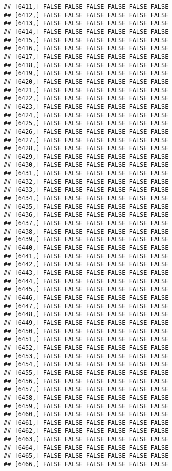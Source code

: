 \documentclass[
]{article}
\begin{document}
\begin{verbatim}
## [6411,] FALSE FALSE FALSE FALSE FALSE FALSE
## [6412,] FALSE FALSE FALSE FALSE FALSE FALSE
## [6413,] FALSE FALSE FALSE FALSE FALSE FALSE
## [6414,] FALSE FALSE FALSE FALSE FALSE FALSE
## [6415,] FALSE FALSE FALSE FALSE FALSE FALSE
## [6416,] FALSE FALSE FALSE FALSE FALSE FALSE
## [6417,] FALSE FALSE FALSE FALSE FALSE FALSE
## [6418,] FALSE FALSE FALSE FALSE FALSE FALSE
## [6419,] FALSE FALSE FALSE FALSE FALSE FALSE
## [6420,] FALSE FALSE FALSE FALSE FALSE FALSE
## [6421,] FALSE FALSE FALSE FALSE FALSE FALSE
## [6422,] FALSE FALSE FALSE FALSE FALSE FALSE
## [6423,] FALSE FALSE FALSE FALSE FALSE FALSE
## [6424,] FALSE FALSE FALSE FALSE FALSE FALSE
## [6425,] FALSE FALSE FALSE FALSE FALSE FALSE
## [6426,] FALSE FALSE FALSE FALSE FALSE FALSE
## [6427,] FALSE FALSE FALSE FALSE FALSE FALSE
## [6428,] FALSE FALSE FALSE FALSE FALSE FALSE
## [6429,] FALSE FALSE FALSE FALSE FALSE FALSE
## [6430,] FALSE FALSE FALSE FALSE FALSE FALSE
## [6431,] FALSE FALSE FALSE FALSE FALSE FALSE
## [6432,] FALSE FALSE FALSE FALSE FALSE FALSE
## [6433,] FALSE FALSE FALSE FALSE FALSE FALSE
## [6434,] FALSE FALSE FALSE FALSE FALSE FALSE
## [6435,] FALSE FALSE FALSE FALSE FALSE FALSE
## [6436,] FALSE FALSE FALSE FALSE FALSE FALSE
## [6437,] FALSE FALSE FALSE FALSE FALSE FALSE
## [6438,] FALSE FALSE FALSE FALSE FALSE FALSE
## [6439,] FALSE FALSE FALSE FALSE FALSE FALSE
## [6440,] FALSE FALSE FALSE FALSE FALSE FALSE
## [6441,] FALSE FALSE FALSE FALSE FALSE FALSE
## [6442,] FALSE FALSE FALSE FALSE FALSE FALSE
## [6443,] FALSE FALSE FALSE FALSE FALSE FALSE
## [6444,] FALSE FALSE FALSE FALSE FALSE FALSE
## [6445,] FALSE FALSE FALSE FALSE FALSE FALSE
## [6446,] FALSE FALSE FALSE FALSE FALSE FALSE
## [6447,] FALSE FALSE FALSE FALSE FALSE FALSE
## [6448,] FALSE FALSE FALSE FALSE FALSE FALSE
## [6449,] FALSE FALSE FALSE FALSE FALSE FALSE
## [6450,] FALSE FALSE FALSE FALSE FALSE FALSE
## [6451,] FALSE FALSE FALSE FALSE FALSE FALSE
## [6452,] FALSE FALSE FALSE FALSE FALSE FALSE
## [6453,] FALSE FALSE FALSE FALSE FALSE FALSE
## [6454,] FALSE FALSE FALSE FALSE FALSE FALSE
## [6455,] FALSE FALSE FALSE FALSE FALSE FALSE
## [6456,] FALSE FALSE FALSE FALSE FALSE FALSE
## [6457,] FALSE FALSE FALSE FALSE FALSE FALSE
## [6458,] FALSE FALSE FALSE FALSE FALSE FALSE
## [6459,] FALSE FALSE FALSE FALSE FALSE FALSE
## [6460,] FALSE FALSE FALSE FALSE FALSE FALSE
## [6461,] FALSE FALSE FALSE FALSE FALSE FALSE
## [6462,] FALSE FALSE FALSE FALSE FALSE FALSE
## [6463,] FALSE FALSE FALSE FALSE FALSE FALSE
## [6464,] FALSE FALSE FALSE FALSE FALSE FALSE
## [6465,] FALSE FALSE FALSE FALSE FALSE FALSE
## [6466,] FALSE FALSE FALSE FALSE FALSE FALSE

\end{verbatim}
\end{document}
